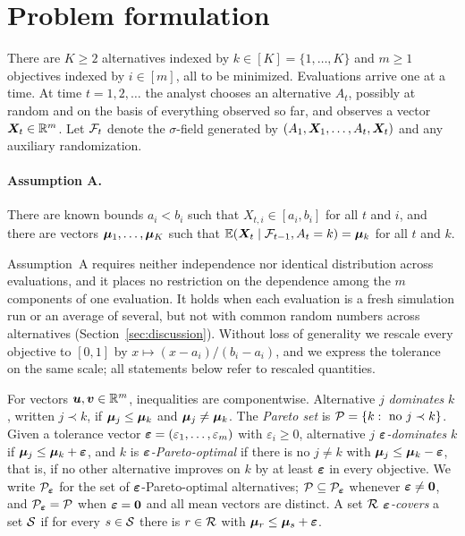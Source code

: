 \section{Problem formulation}\label{sec:problem}

There are $K\ge 2$ alternatives indexed by $k\in[K]=\{1,\dots,K\}$ and $m\ge1$ objectives indexed by $i\in[m]$, all to be minimized. Evaluations arrive one at a time. At time $t=1,2,\dots$ the analyst chooses an alternative $A_t$, possibly at random and on the basis of everything observed so far, and observes a vector $\bm{X}_t\in\mathbb{R}^m$. Let $\mathcal{F}_{t}$ denote the $\sigma$-field generated by $(A_1,\bm{X}_1,\dots,A_t,\bm{X}_t)$ and any auxiliary randomization.

\paragraph{Assumption A.} There are known bounds $a_i<b_i$ such that $X_{t,i}\in[a_i,b_i]$ for all $t$ and $i$, and there are vectors $\bm{\mu}_1,\dots,\bm{\mu}_K$ such that $\mathbb{E}(\bm{X}_t\mid\mathcal{F}_{t-1},A_t=k)=\bm{\mu}_k$ for all $t$ and $k$.

Assumption~A requires neither independence nor identical distribution across evaluations, and it places no restriction on the dependence among the $m$ components of one evaluation. It holds when each evaluation is a fresh simulation run or an average of several, but not with common random numbers across alternatives (Section~\ref{sec:discussion}). Without loss of generality we rescale every objective to $[0,1]$ by $x\mapsto(x-a_i)/(b_i-a_i)$, and we express the tolerance on the same scale; all statements below refer to rescaled quantities.

For vectors $\bm{u},\bm{v}\in\mathbb{R}^m$, inequalities are componentwise. Alternative $j$ \emph{dominates} $k$, written $j\prec k$, if $\bm{\mu}_j\le\bm{\mu}_k$ and $\bm{\mu}_j\ne\bm{\mu}_k$. The \emph{Pareto set} is $\mathcal{P}=\{k:\text{ no }j\prec k\}$. Given a tolerance vector $\bm{\varepsilon}=(\varepsilon_1,\dots,\varepsilon_m)$ with $\varepsilon_i\ge0$, alternative $j$ \emph{$\bm{\varepsilon}$-dominates} $k$ if $\bm{\mu}_j\le\bm{\mu}_k+\bm{\varepsilon}$, and $k$ is \emph{$\bm{\varepsilon}$-Pareto-optimal} if there is no $j\ne k$ with $\bm{\mu}_j\le\bm{\mu}_k-\bm{\varepsilon}$, that is, if no other alternative improves on $k$ by at least $\bm{\varepsilon}$ in every objective. We write $\mathcal{P}_{\bm{\varepsilon}}$ for the set of $\bm{\varepsilon}$-Pareto-optimal alternatives; $\mathcal{P}\subseteq\mathcal{P}_{\bm{\varepsilon}}$ whenever $\bm{\varepsilon}\ne\bm 0$, and $\mathcal{P}_{\bm{\varepsilon}}=\mathcal{P}$ when $\bm{\varepsilon}=\bm0$ and all mean vectors are distinct. A set $\mathcal{R}$ \emph{$\bm{\varepsilon}$-covers} a set $\mathcal{S}$ if for every $s\in\mathcal{S}$ there is $r\in\mathcal{R}$ with $\bm{\mu}_r\le\bm{\mu}_s+\bm{\varepsilon}$.

